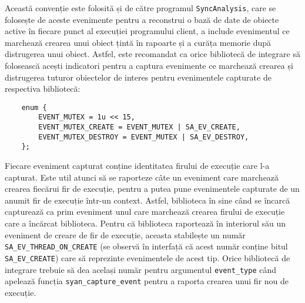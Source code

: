 Această convenție este folosită și de către programul
\lstinline{SyncAnalysis}, care se folosește de aceste evenimente pentru
a reconstrui o bază de date de obiecte active în fiecare punct al
execuției programului client, a include evenimentul ce marchează
crearea unui obiect țintă în rapoarte și a curăța memorie după
distrugerea unui obiect. Astfel, este recomandat ca orice bibliotecă de
integrare să folosească acești indicatori pentru a captura evenimente ce
marchează crearea și distrugerea tuturor obiectelor de interes pentru
evenimentele capturate de respectiva bibliotecă:
\begin{lstlisting}
    enum {
        EVENT_MUTEX = 1u << 15,
        EVENT_MUTEX_CREATE = EVENT_MUTEX | SA_EV_CREATE,
        EVENT_MUTEX_DESTROY = EVENT_MUTEX | SA_EV_DESTROY,
    };
\end{lstlisting}

Fiecare eveniment capturat conține identitatea firului de execuție care
l-a capturat. Este util atunci să se raporteze câte un eveniment care
marchează crearea fiecărui fir de execuție, pentru a putea pune
evenimentele capturate de un anumit fir de execuție într-un context.
Astfel, biblioteca în sine când se încarcă capturează ca prim eveniment
unul care marchează crearea firului de execuție care a încărcat
biblioteca. Pentru că biblioteca raportează în interiorul său un
eveniment de creare de fir de execuție, aceasta stabilește un număr
\lstinline{SA_EV_THREAD_ON_CREATE} (se observă în interfață că acest
număr conține bitul \lstinline{SA_EV_CREATE}) care să reprezinte
evenimentele de acest tip. Orice bibliotecă de integrare trebuie să dea
același număr pentru argumentul \lstinline{event_type} când apelează
funcția \lstinline{syan_capture_event} pentru a raporta crearea unui fir
nou de execuție.

